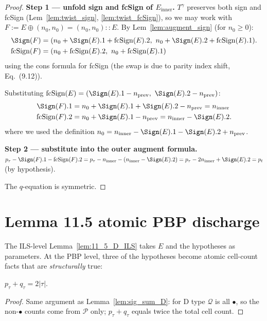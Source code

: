 \begin{proof}
  \leanok
  \textbf{Step 1 — unfold sign and fcSign of $E_{\mathrm{inner}}$.}
  $T^\gamma$ preserves both sign and fcSign (Lem~\ref{lem:twist_sign}, \ref{lem:twist_fcSign}), so we may work with $F := E \oplus (n_0, n_0) = (n_0, n_0) :: E$.
  By Lem~\ref{lem:augment_sign} (for $n_0 \geq 0$):
  \begin{align*}
    \Sign(F) &= (n_0 + \Sign(E).1 + \mathrm{fcSign}(E).2,\ n_0 + \Sign(E).2 + \mathrm{fcSign}(E).1). \\
    \mathrm{fcSign}(F) &= (n_0 + \mathrm{fcSign}(E).2,\ n_0 + \mathrm{fcSign}(E).1)
  \end{align*}
  using the cons formula for fcSign (the swap is due to parity index shift, Eq.~(9.12)).

  Substituting $\mathrm{fcSign}(E) = (\Sign(E).1 - n_{\mathrm{prev}},\ \Sign(E).2 - n_{\mathrm{prev}})$:
  \begin{align*}
    \Sign(F).1 &= n_0 + \Sign(E).1 + \Sign(E).2 - n_{\mathrm{prev}} = n_{\mathrm{inner}} \\
    \mathrm{fcSign}(F).2 &= n_0 + \Sign(E).1 - n_{\mathrm{prev}} = n_{\mathrm{inner}} - \Sign(E).2.
  \end{align*}
  where we used the definition $n_0 = n_{\mathrm{inner}} - \Sign(E).1 - \Sign(E).2 + n_{\mathrm{prev}}$.

  \textbf{Step 2 — substitute into the outer augment formula.}
  $p_\tau - \Sign(F).1 - \mathrm{fcSign}(F).2 = p_\tau - n_{\mathrm{inner}} - (n_{\mathrm{inner}} - \Sign(E).2) = p_\tau - 2 n_{\mathrm{inner}} + \Sign(E).2 = p_t$ (by hypothesis).

  The $q$-equation is symmetric.
\end{proof}

\section{Lemma 11.5 atomic PBP discharge}

The ILS-level Lemma~\ref{lem:11_5_D_ILS} takes $E$ and the hypotheses as parameters.
At the PBP level, three of the hypotheses become atomic cell-count facts that
are \emph{structurally} true:

\begin{lemma}
  \label{lem:fact1_sig_sum}
  \leanok
  $p_\tau + q_\tau = 2|\tau|$.
\end{lemma}
\begin{proof}
  \leanok
  Same argument as Lemma~\ref{lem:sig_sum_D}: for D type $\mathcal{Q}$ is all $\bullet$, so the non-$\bullet$ counts come from $\mathcal{P}$ only; $p_\tau + q_\tau$ equals twice the total cell count.
\end{proof}



